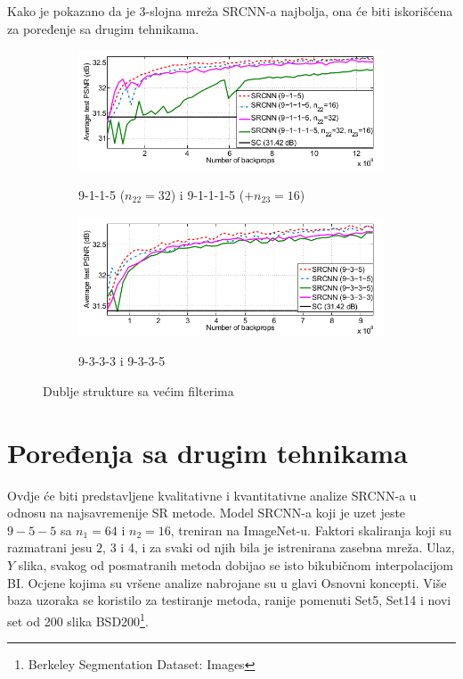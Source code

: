 \documentclass[12pt]{report}
\numberwithin{equation}{section}
\begin{document}
     Kako je pokazano da je $3$-slojna mreža SRCNN-a najbolja, ona će biti iskorišćena za poređenje sa drugim tehnikama.      

\begin{figure}[h]
\begin{subfigure}{0.5\textwidth}
  \centering
   \caption{9-1-1-5 ($n_{22}=32$) i 9-1-1-1-5 ($+ n_{23}=16$)}
  \includegraphics[width=1\linewidth]{SLIKE/figure9a}
  \label{fig:ogled91}
\end{subfigure}
\vspace{-20pt}
\begin{subfigure}{0.5\textwidth}
  \centering
    \caption{9-3-3-3 i 9-3-3-5}
  \includegraphics[width=1\linewidth]{SLIKE/figure9b}
  \label{fig:ogled92}
\end{subfigure}
\caption{Dublje strukture sa većim filterima}
\label{fig:ogled9}
\end{figure}
\newpage
  \section{Poređenja sa drugim tehnikama}
  
  Ovdje će biti predstavljene kvalitativne i kvantitativne analize SRCNN-a u odnosu na najsavremenije SR metode. Model SRCNN-a koji je uzet jeste $9-5-5$ sa $n_1=64$ i $n_2=16$, treniran na ImageNet-u. Faktori skaliranja koji su razmatrani jesu $2$, $3$ i 4, i za svaki od njih bila je istrenirana zasebna mreža. Ulaz, $Y$ slika, svakog od posmatranih metoda dobijao se isto bikubičnom interpolacijom BI. Ocjene kojima su vršene analize nabrojane su u glavi Osnovni koncepti. Više baza uzoraka se koristilo za testiranje metoda, ranije pomenuti Set5, Set14 i novi set od 200 slika BSD200\footnote{Berkeley Segmentation Dataset: Images}.  
  
\end{document}
